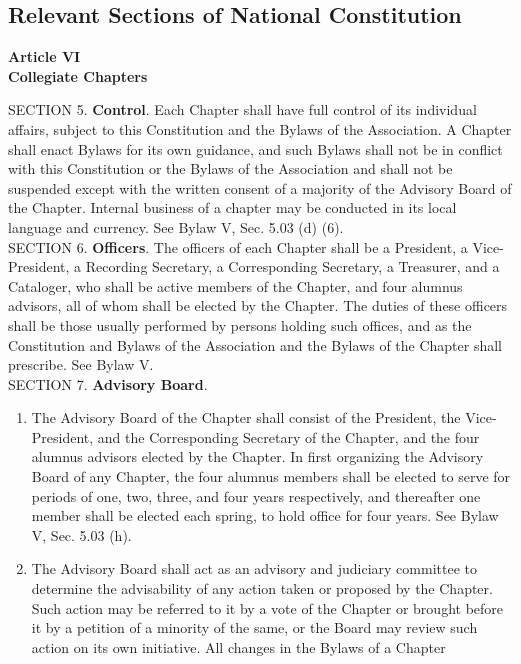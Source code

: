 \resetformat
\begin{optionalpart}
\part{Relevant Sections of National Constitution}
\begin{center}
{\bf Article VI\\
Collegiate Chapters}
\end{center}
SECTION 5. {\bf Control}. Each Chapter shall have full control of its individual affairs, subject 
to this Constitution and the Bylaws of the Association. A Chapter shall enact Bylaws for its 
own guidance, and such Bylaws shall not be in conflict with this Constitution or the Bylaws 
of the Association and shall not be suspended except with the written consent of a majority 
of the Advisory Board of the Chapter. Internal business of a chapter may be conducted in 
its local language and currency. See Bylaw V, Sec. 5.03 (d) (6). \\[1em]
SECTION 6. {\bf  Officers}. The officers of each Chapter shall be a President, a Vice-President, 
a Recording Secretary, a Corresponding Secretary, a Treasurer, and a Cataloger, who shall 
be active members of the Chapter, and four alumnus advisors, all of whom shall be elected 
by the Chapter. The duties of these officers shall be those usually performed by persons 
holding such offices, and as the Constitution and Bylaws of the Association and the Bylaws 
of the Chapter shall prescribe. See Bylaw V.\\[1em]
SECTION 7. {\bf Advisory Board}.
\begin{enumerate}
\item The Advisory Board of the Chapter shall consist of 
the President, the Vice-President, and the Corresponding Secretary of the Chapter, and the 
four alumnus advisors elected by the Chapter. In first organizing the Advisory Board of 
any Chapter, the four alumnus members shall be elected to serve for periods of one, two, 
three, and four years respectively, and thereafter one member shall be elected each spring, 
to hold office for four years. See Bylaw V, Sec. 5.03 (h).
\item The Advisory Board shall act as an advisory and judiciary committee to determine the 
advisability of any action taken or proposed by the Chapter. Such action may be referred to 
it by a vote of the Chapter or brought before it by a petition of a minority of the same, or the 
Board may review such action on its own initiative. All changes in the Bylaws of a Chapter 

\end{enumerate}
\end{optionalpart}
